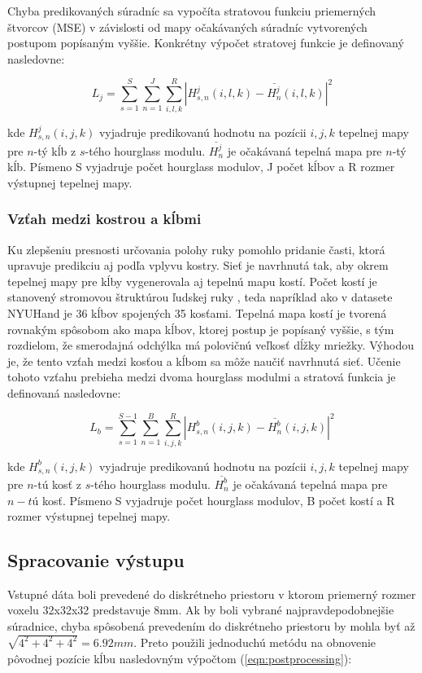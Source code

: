Chyba predikovaných súradníc sa vypočíta stratovou funkciu priemerných štvorcov (MSE) v závislosti od mapy očakávaných súradníc vytvorených postupom popísaným vyššie. Konkrétny výpočet stratovej funkcie je definovaný nasledovne:

\begin{equation}\label{eqn:fuyang_loss_joint}
    L_j = \sum_{s=1}^S{ \sum_{n=1}^J{ \sum_{i,l,k}^R{|H_{s,n}^j(i,l,k) - \overset{\_}{H_n^j}(i,l,k) |^2} } }
\end{equation}

kde $H_{s,n}^j(i,j,k)$ vyjadruje predikovanú hodnotu na pozícii $i,j,k$ tepelnej mapy pre $n$-tý kĺb z $s$-tého hourglass modulu. $\overset{\_}{H_n^j}$ je očakávaná tepelná mapa pre $n$-tý kĺb. Písmeno S vyjadruje počet hourglass modulov, J počet kĺbov a R rozmer výstupnej tepelnej mapy.

\subsubsection{Vzťah medzi kostrou a kĺbmi}\label{bonesLearning}
Ku zlepšeniu presnosti určovania polohy ruky pomohlo pridanie časti, ktorá upravuje predikciu aj podľa vplyvu kostry. Sieť je navrhnutá tak, aby okrem tepelnej mapy pre kĺby vygenerovala aj tepelnú mapu kostí. Počet kostí je stanovený stromovou štruktúrou ľudskej ruky , teda napríklad ako v datasete NYUHand je 36 kĺbov spojených 35 kosťami. Tepelná mapa kostí je tvorená rovnakým spôsobom ako mapa kĺbov, ktorej postup je popísaný vyššie, s tým rozdielom, že smerodajná odchýlka má polovičnú veľkosť dĺžky mriežky. Výhodou je, že tento vzťah medzi kosťou a kĺbom sa môže naučiť navrhnutá sieť. Učenie tohoto vzťahu prebieha medzi dvoma hourglass modulmi a stratová funkcia je definovaná nasledovne:

\begin{equation}\label{eqn:fuyang_loss_bone}
    L_b = \sum_{s=1}^{S-1}{ \sum_{n=1}^B{ \sum_{i,j,k}^R{|H_{s,n}^b(i,j,k) - \overset{\_}{H_n^b}(i,j,k) |^2} } }
\end{equation}

kde $H_{s,n}^b(i,j,k)$ vyjadruje predikovanú hodnotu na pozícii $i,j,k$ tepelnej mapy pre $n$-tú kosť z $s$-tého hourglass modulu. $\overset{\_}{H_n^b}$ je očakávaná tepelná mapa pre $n-tú$ kosť. Písmeno S vyjadruje počet hourglass modulov, B počet kostí a R rozmer výstupnej tepelnej mapy.

\subsection{Spracovanie výstupu}
Vstupné dáta boli prevedené do diskrétneho priestoru v ktorom priemerný rozmer voxelu 32x32x32 predstavuje 8mm. Ak by boli vybrané najpravdepodobnejšie súradnice, chyba spôsobená prevedením do diskrétneho priestoru by mohla byť až $\sqrt{4^2+4^2+4^2} = 6.92mm$. Preto použili jednoduchú metódu na obnovenie pôvodnej pozície kĺbu nasledovným výpočtom (\ref{eqn:postprocessing}):

